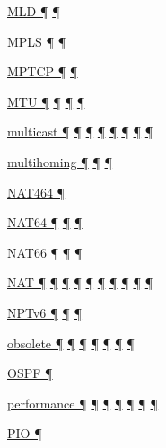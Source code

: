 \documentclass[
]{article}
\begin{document}
\hyperref[address-resolution]{MLD ¶}
\hyperref[layer-2-considerations]{¶}

\hyperref[layer-2-functions]{MPLS ¶} \hyperref[tunnels]{¶}

\hyperref[transport-protocols]{MPTCP ¶} \hyperref[multihoming]{¶}

\hyperref[extension-headers-and-options]{MTU ¶}
\hyperref[layer-2-functions]{¶} \hyperref[packet-format]{¶}
\hyperref[packet-size-and-jumbo-frames]{¶}

\hyperref[address-resolution]{multicast ¶} \hyperref[addresses]{¶}
\hyperref[auto-configuration]{¶} \hyperref[layer-2-functions]{¶}
\hyperref[ipv6-primary-differences-from-ipv4]{¶} \hyperref[filtering]{¶}
\hyperref[layer-2-considerations]{¶} \hyperref[energy-consumption]{¶}

\hyperref[multi-prefix-operation]{multihoming ¶}
\hyperref[multihoming]{¶} \hyperref[deployment-in-the-enterprise]{¶}

\hyperref[translation-and-ipv4-as-a-service]{NAT464 ¶}

\hyperref[dual-stack-scenarios]{NAT64 ¶}
\hyperref[obsolete-techniques]{¶}
\hyperref[translation-and-ipv4-as-a-service]{¶}

\hyperref[ipv6-primary-differences-from-ipv4]{NAT66 ¶}
\hyperref[translation-and-ipv4-as-a-service]{¶} \hyperref[security]{¶}

\hyperref[transport-protocols]{NAT ¶} \hyperref[dual-stack-scenarios]{¶}
\hyperref[obsolete-techniques]{¶}
\hyperref[translation-and-ipv4-as-a-service]{¶} \hyperref[tunnels]{¶}
\hyperref[security]{¶} \hyperref[topology-obfuscation]{¶}
\hyperref[address-planning]{¶} \hyperref[multihoming]{¶}
\hyperref[deployment-in-the-enterprise]{¶}

\hyperref[translation-and-ipv4-as-a-service]{NPTv6 ¶}
\hyperref[security]{¶} \hyperref[multihoming]{¶}

\hyperref[how-to-keep-up-to-date]{obsolete ¶}
\hyperref[obsolete-features-in-ipv6]{¶} \hyperref[addresses]{¶}
\hyperref[dns]{¶} \hyperref[further-reading]{¶}
\hyperref[obsolete-techniques]{¶} \hyperref[tunnels]{¶}

\hyperref[routing]{OSPF ¶}

\hyperref[dual-stack-scenarios]{performance ¶}
\hyperref[ipv6-primary-differences-from-ipv4]{¶} \hyperref[filtering]{¶}
\hyperref[network-design]{¶} \hyperref[management-and-operations]{¶}
\hyperref[multihoming]{¶} \hyperref[packet-size-and-jumbo-frames]{¶}

\hyperref[auto-configuration]{PIO ¶}
\end{document}
